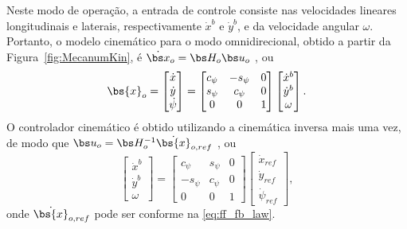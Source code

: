     Neste modo de operação, a entrada de controle consiste nas velocidades lineares longitudinais e laterais, respectivamente $\dot{x}^b$ e $\dot{y}^b$, e da velocidade angular $\omega$. Portanto, o modelo cinemático para o modo omnidirecional, obtido a partir da Figura~\ref{fig:MecanumKin}, é $\dot{\bs x}_{o} = \bs H_o \bs u_o$ \cite{Sarcinelli-Filho2023_2}, ou
    \begin{equation}
        \bs{x}_{o}=\begin{bmatrix} \dot{x} \\ \dot{y} \\  \dot{\psi}  \end{bmatrix} = \begin{bmatrix} c_\psi & -s_\psi & 0 \\ s_\psi & c_\psi & 0 \\ 0 & 0 & 1 \end{bmatrix}  \begin{bmatrix} \dot{x}^b \\ \dot{y}^b \\ \omega \end{bmatrix}.
    \end{equation}
    \noindent O controlador cinemático é obtido utilizando a cinemática inversa mais uma vez, de modo que $\bs u_o = \bs H_o^{-1} \dot{\bs{x}}_{o,ref} $ \cite{Sarcinelli-Filho2023_4}, ou
    \begin{equation}
        \begin{bmatrix} \dot{x}^b \\ \dot{y}^b \\ \omega \end{bmatrix} = \begin{bmatrix} c_\psi & s_\psi & 0 \\ -s_\psi & c_\psi & 0 \\ 0 & 0 & 1 \end{bmatrix} \begin{bmatrix} \dot{x}_{ref} \\ \dot{y}_{ref} \\  \dot{\psi}_{ref}  \end{bmatrix},
    \end{equation}
    \noindent onde $\dot{\bs{x}}_{o,ref}$ pode ser conforme na \eqref{eq:ff_fb_law}.
    
    